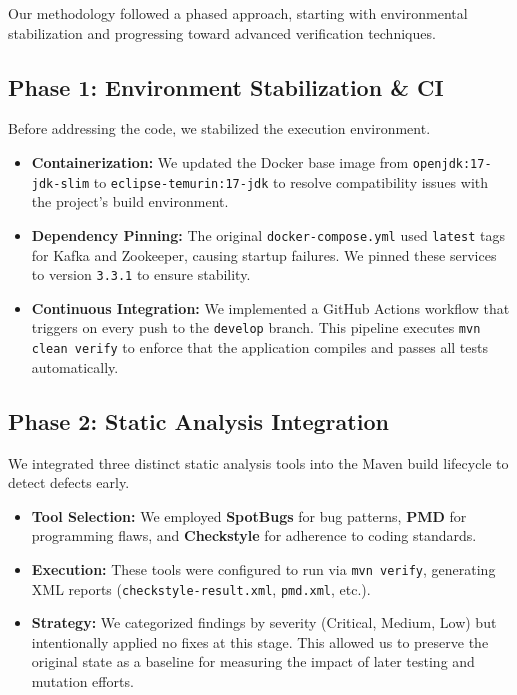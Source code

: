 Our methodology followed a phased approach, starting with environmental stabilization and progressing toward advanced verification techniques.

\subsection{Phase 1: Environment Stabilization \& CI}
Before addressing the code, we stabilized the execution environment.
\begin{itemize}
    \item \textbf{Containerization:} We updated the Docker base image from \texttt{openjdk:17-jdk-slim} to \texttt{eclipse-temurin:17-jdk} to resolve compatibility issues with the project's build environment.
    \item \textbf{Dependency Pinning:} The original \texttt{docker-compose.yml} used \texttt{latest} tags for Kafka and Zookeeper, causing startup failures. We pinned these services to version \texttt{3.3.1} to ensure stability.
    \item \textbf{Continuous Integration:} We implemented a GitHub Actions workflow that triggers on every push to the \texttt{develop} branch. This pipeline executes \texttt{mvn clean verify} to enforce that the application compiles and passes all tests automatically.
\end{itemize}

\subsection{Phase 2: Static Analysis Integration}
We integrated three distinct static analysis tools into the Maven build lifecycle to detect defects early.
\begin{itemize}
    \item \textbf{Tool Selection:} We employed \textbf{SpotBugs} for bug patterns, \textbf{PMD} for programming flaws, and \textbf{Checkstyle} for adherence to coding standards.
    \item \textbf{Execution:} These tools were configured to run via \texttt{mvn verify}, generating XML reports (\texttt{checkstyle-result.xml}, \texttt{pmd.xml}, etc.).
    \item \textbf{Strategy:} We categorized findings by severity (Critical, Medium, Low) but intentionally applied no fixes at this stage. This allowed us to preserve the original state as a baseline for measuring the impact of later testing and mutation efforts.
\end{itemize}

